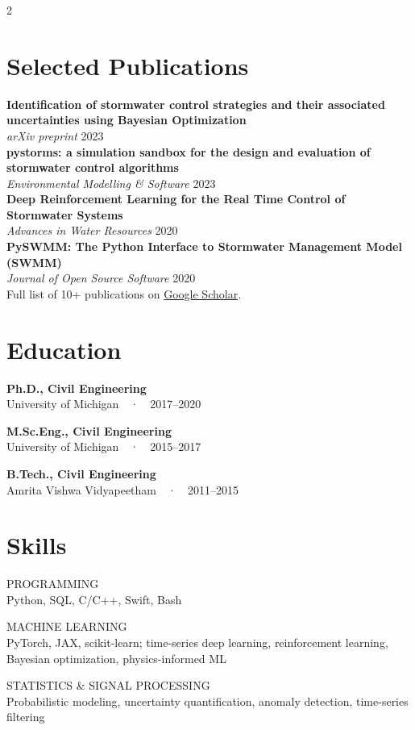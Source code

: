 \documentclass{article}
\newcommand{\degreeyear}[2]{
  {\textbf{#1}}\\
  {\small\textcolor{slate}{#2}}
}
\newcommand{\publication}[3]{
  \textbf{#1}\\
  {\small\textit{#2}} \hfill {\metafont\footnotesize\textcolor{slate}{#3}}\\[0.4em]
}
\newcommand{\skillgroup}[2]{
  {\metafont\footnotesize\textcolor{cardinal}{#1}}\\
  {\small #2}
  \vspace{0.3em}
}
\begin{document}
\begin{paracol}{2}
\section{Selected Publications}
\publication{Identification of stormwater control strategies and their associated uncertainties using Bayesian Optimization}{arXiv preprint}{2023}

\publication{pystorms: a simulation sandbox for the design and evaluation of stormwater control algorithms}{Environmental Modelling \& Software}{2023}

\publication{Deep Reinforcement Learning for the Real Time Control of Stormwater Systems}{Advances in Water Resources}{2020}

\publication{PySWMM: The Python Interface to Stormwater Management Model (SWMM)}{Journal of Open Source Software}{2020}

{\footnotesize\textcolor{slate}{Full list of 10+ publications on \href{https://scholar.google.com/citations?user=W9mUihUAAAAJ}{Google Scholar}.}}

\switchcolumn

\begin{flushleft}

\section{Education}
\vspace{0.3em}
\degreeyear{Ph.D., Civil Engineering}{University of Michigan~~·~~2017--2020}

\vspace{0.45em}
\degreeyear{M.Sc.Eng., Civil Engineering}{University of Michigan~~·~~2015--2017}

\vspace{0.45em}
\degreeyear{B.Tech., Civil Engineering}{Amrita Vishwa Vidyapeetham~~·~~2011--2015}

\section{Skills}
\vspace{0.3em}
\skillgroup{PROGRAMMING}{Python, SQL, C/C++, Swift, Bash}

\skillgroup{MACHINE LEARNING}{PyTorch, JAX, scikit-learn; time-series deep learning, reinforcement learning, Bayesian optimization, physics-informed ML}

\skillgroup{STATISTICS \& SIGNAL PROCESSING}{Probabilistic modeling, uncertainty quantification, anomaly detection, time-series filtering}


\end{flushleft}
\end{paracol}
\end{document}
